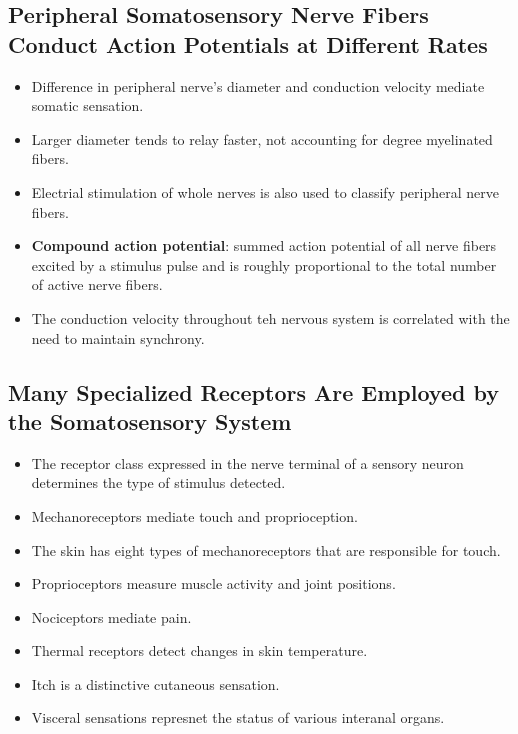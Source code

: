 \documentclass[12pt,a4paper]{article}
\begin{document}
\subsection{Peripheral Somatosensory Nerve Fibers Conduct Action Potentials at Different Rates}
\begin{itemize}
    \item Difference in peripheral nerve's diameter and conduction velocity mediate somatic sensation.
    \item Larger diameter tends to relay faster, not accounting for degree myelinated fibers.
    \item Electrial stimulation of whole nerves is also used to classify peripheral nerve fibers.
    \item \textbf{Compound action potential}: summed action potential of all nerve fibers excited by a stimulus pulse and is roughly proportional to the total number of active nerve fibers.
    \item The conduction velocity throughout teh nervous system is correlated with the need to maintain synchrony.
\end{itemize}

\subsection{Many Specialized Receptors Are Employed by the Somatosensory System}
\begin{itemize}
    \item The receptor class expressed in the nerve terminal of a sensory neuron determines the type of stimulus detected.
    \item Mechanoreceptors mediate touch and proprioception.
    \item The skin has eight types of mechanoreceptors that are responsible for touch.
    \item Proprioceptors measure muscle activity and joint positions.
    \item Nociceptors mediate pain.
    \item Thermal receptors detect changes in skin temperature.
    \item Itch is a distinctive cutaneous sensation.
    \item Visceral sensations represnet the status of various interanal organs.
\end{itemize}

\clearpage
\end{document}
